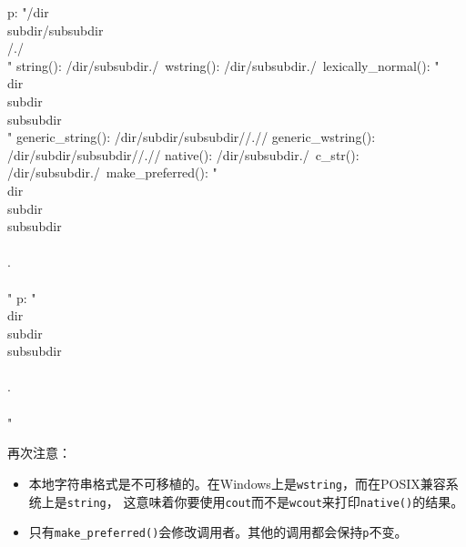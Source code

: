 \begin{blacklisting}
    p:                  "/dir\\subdir/subsubdir\\/./\\"
    string():           /dir\subdir/subsubdir\/./\
    wstring():          /dir\subdir/subsubdir\/./\
    lexically_normal(): "\\dir\\subdir\\subsubdir\\"
    generic_string():   /dir/subdir/subsubdir//.//
    generic_wstring():  /dir/subdir/subsubdir//.//
    native():           /dir\subdir/subsubdir\/./\
    c_str():            /dir\subdir/subsubdir\/./\
    make_preferred():   "\\dir\\subdir\\subsubdir\\\\.\\\\"
    p:                  "\\dir\\subdir\\subsubdir\\\\.\\\\"
\end{blacklisting}
再次注意：
\begin{itemize}
    \item 本地字符串格式是不可移植的。在Windows上是\texttt{wstring}，而在POSIX兼容系统上是\texttt{string}，
    这意味着你要使用\texttt{cout}而不是\texttt{wcout}来打印\texttt{native()}的结果。
    \item 只有\texttt{make\_preferred()}会修改调用者。其他的调用都会保持\texttt{p}不变。
\end{itemize}

